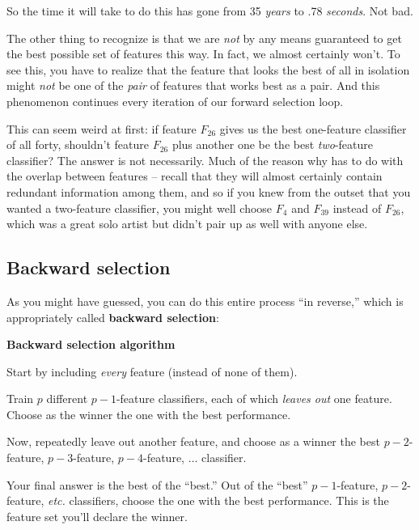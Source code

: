 So the time it will take to do this has gone from 35 \textit{years} to .78
\textit{seconds}. Not bad.

The other thing to recognize is that we are \textit{not} by any means
guaranteed to get the best possible set of features this way. In fact, we
almost certainly won't. To see this, you have to realize that the feature that
looks the best of all in isolation might \textit{not} be one of the
\textit{pair} of features that works best as a pair. And this phenomenon
continues every iteration of our forward selection loop.

This can seem weird at first: if feature $F_{26}$ gives us the best
one-feature classifier of all forty, shouldn't feature $F_{26}$ plus another
one be the best \textit{two}-feature classifier? The answer is not
necessarily. Much of the reason why has to do with the overlap between
features -- recall that they will almost certainly contain redundant
information among them, and so if you knew from the outset that you wanted a
two-feature classifier, you might well choose $F_4$ and $F_{39}$ instead of
$F_{26}$, which was a great solo artist but didn't pair up as well with anyone
else.

\subsection{Backward selection}


As you might have guessed, you can do this entire process ``in reverse,''
which is appropriately called \textbf{backward selection}:

\begin{shaded}
\vspace{-.2in}
\begin{center}
\textbf{Backward selection algorithm}
\end{center}

\begin{compactenum}
\small
\item Start by including \textit{every} feature (instead of none of them).
\item Train $p$ different $p-1$-feature classifiers, each of which
\textit{leaves out} one feature. Choose as the winner the one with the
best performance.
\item Now, repeatedly leave out another feature, and choose as a winner the
best $p-2$-feature, $p-3$-feature, $p-4$-feature, $\dots$ classifier.
\item Your final answer is the best of the ``best.'' Out of the ``best''
$p-1$-feature, $p-2$-feature, \textit{etc.} classifiers, choose the one with
the best performance. This is the feature set you'll declare the winner.
\end{compactenum}
\end{shaded}

